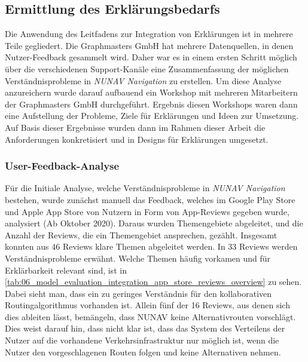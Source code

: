 \subsection{Ermittlung des Erklärungsbedarfs}

Die Anwendung des Leitfadens zur Integration von Erklärungen ist in mehrere Teile gegliedert. Die Graphmasters GmbH hat mehrere Datenquellen, in denen Nutzer-Feedback gesammelt wird. Daher war es in einem ersten Schritt möglich über die verschiedenen Support-Kanäle eine Zusammenfassung der möglichen Verständnisprobleme in \textit{NUNAV Navigation} zu erstellen. Um diese Analyse anzureichern wurde darauf aufbauend ein Workshop mit mehreren Mitarbeitern der Graphmasters GmbH durchgeführt. Ergebnis diesen Workshops waren dann eine Aufstellung der Probleme, Ziele für Erklärungen und Ideen zur Umsetzung. Auf Basis dieser Ergebnisse wurden dann im Rahmen dieser Arbeit die Anforderungen konkretisiert und in Designs für Erklärungen umgesetzt.

\subsubsection{User-Feedback-Analyse}

Für die Initiale Analyse, welche Verständnisprobleme in \textit{NUNAV Navigation} bestehen, wurde zunächst manuell das Feedback, welches im Google Play Store und Apple App Store von Nutzern in Form von App-Reviews gegeben wurde, analysiert (Ab Oktober 2020). Daraus wurden Themengebiete abgeleitet, und die Anzahl der Reviews, die ein Themengebiet ansprechen, gezählt. Insgesamt konnten aus 46 Reviews klare Themen abgeleitet werden. In 33 Reviews werden Verständnisprobleme erwähnt. Welche Themen häufig vorkamen und für Erklärbarkeit relevant sind, ist in \autoref{tab:06_model_evaluation_integration_app_store_reviews_overview} zu sehen. Dabei sieht man, dass ein zu geringes Verständnis für den kollaborativen Routingalgorithmus vorhanden ist. Allein fünf der 16 Reviews, aus denen sich dies ableiten lässt, bemängeln, dass NUNAV keine Alternativrouten vorschlägt. Dies weist darauf hin, dass nicht klar ist, dass das System des Verteilens der Nutzer auf die vorhandene Verkehrsinfrastruktur nur möglich ist, wenn die Nutzer den vorgeschlagenen Routen folgen und keine Alternativen nehmen.

